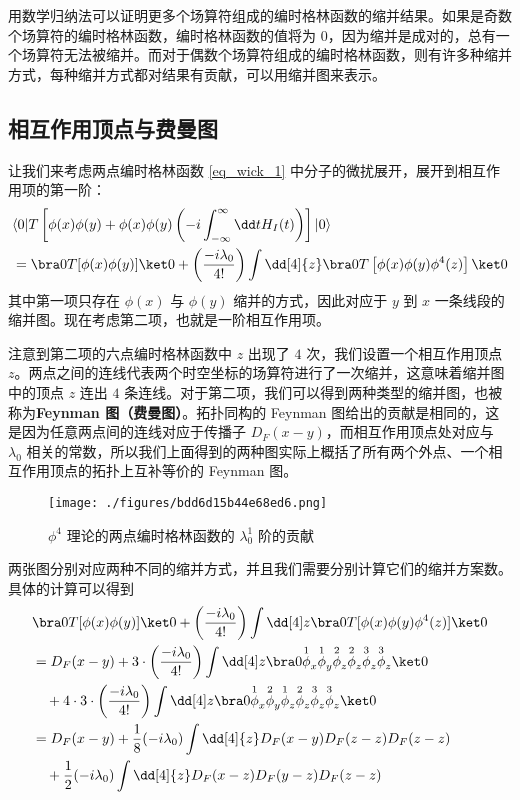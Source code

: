 用数学归纳法可以证明更多个场算符组成的编时格林函数的缩并结果。如果是奇数个场算符的编时格林函数，编时格林函数的值将为 $0$，因为缩并是成对的，总有一个场算符无法被缩并。而对于偶数个场算符组成的编时格林函数，则有许多种缩并方式，每种缩并方式都对结果有贡献，可以用缩并图来表示。
\subsection{相互作用顶点与费曼图}
让我们来考虑两点编时格林函数 \autoref{eq_wick_1} 中分子的微扰展开，展开到相互作用项的第一阶：
\begin{equation}
\begin{aligned}
&\langle 0| T\left[\phi(x)\phi(y)+\phi(x)\phi(y)\left(-i\int_{-\infty}^{\infty}\dd t H_I(t)\right)\right] | 0\rangle\\
&=\bra 0 T[\phi(x)\phi(y)] \ket 0 
+\left(\frac{-i\lambda_0}{4!}\right) \int \dd[4]{z} \bra 0 T\left[ \phi(x)\phi(y)\phi^4(z) \right]\ket 0
\end{aligned}
\end{equation}
其中第一项只存在 $\phi(x)$ 与 $\phi(y)$ 缩并的方式，因此对应于 $y$ 到 $x$ 一条线段的缩并图。现在考虑第二项，也就是一阶相互作用项。

注意到第二项的六点编时格林函数中 $z$ 出现了 $4$ 次，我们设置一个相互作用顶点 $z$。两点之间的连线代表两个时空坐标的场算符进行了一次缩并，这意味着缩并图中的顶点 $z$ 连出 $4$ 条连线。对于第二项，我们可以得到两种类型的缩并图，也被称为\textbf{Feynman 图（费曼图）}。拓扑同构的 Feynman 图给出的贡献是相同的，这是因为任意两点间的连线对应于传播子 $D_F(x-y)$，而相互作用顶点处对应与 $\lambda_0$ 相关的常数，所以我们上面得到的两种图实际上概括了所有两个外点、一个相互作用顶点的拓扑上互补等价的 Feynman 图。

\begin{figure}[ht]
\centering
\texttt{[image: ./figures/bdd6d15b44e68ed6.png]}
\caption{$\phi^4$ 理论的两点编时格林函数的 $\lambda_0^1$ 阶的贡献} \label{fig_wick1}
\end{figure}

两张图分别对应两种不同的缩并方式，并且我们需要分别计算它们的缩并方案数。具体的计算可以得到
\begin{equation}
\begin{aligned}
&\bra 0 T[\phi(x)\phi(y)] \ket 0 
+\left(\frac{-i\lambda_0}{4!}\right) \int \dd[4] z \bra 0 T[\phi(x)\phi(y)\phi^4(z) ]\ket 0\\
&=D_F(x-y)+3\cdot \left(\frac{-i\lambda_0}{4!}\right)\int \dd[4] z 
\bra 0 \overset{1}{\phi}_x\overset{1}{\phi}_y \overset{2}{\phi}_z\overset{2}{\phi}_z\overset{3}{\phi}_z \overset{3}{\phi}_z\ket 0\\
&\quad +4\cdot 3 \cdot \left(\frac{-i\lambda_0}{4!}\right)\int \dd[4] z 
\bra 0 \overset{1}{\phi}_x\overset{2}{\phi}_y \overset{1}{\phi}_z\overset{2}{\phi}_z\overset{3}{\phi}_z \overset{3}{\phi}_z\ket 0\\
&=D_F(x-y)+\frac{1}{8} (-i\lambda_0)\int \dd[4]{z} D_F(x-y)D_F(z-z)D_F(z-z) \\
&\quad + \frac{1}{2} (-i\lambda_0)\int \dd[4]{z} D_F(x-z)D_F(y-z)D_F(z-z)
\end{aligned}
\end{equation}

